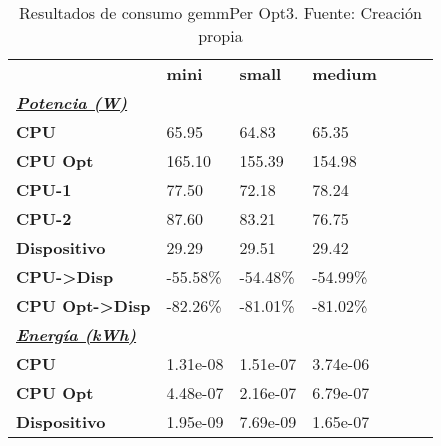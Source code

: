 \begin{table}[H]
    \centering
    \begin{tabular}{lllllll}
    \rowcolor[HTML]{DAE8FC} \ & \textbf{mini} & \textbf{	small} & \textbf{	medium} \\
    \cellcolor[HTML]{DAE8FC} \textbf{\textbf{{\emph{{\underline{{Potencia (W)}}}}}}} &  & 	 & 	 \\
    \rowcolor[HTML]{EFEFEF} \cellcolor[HTML]{DAE8FC} \textbf{CPU} & 65.95 & 	64.83 & 	65.35 \\
    \cellcolor[HTML]{DAE8FC} \textbf{CPU Opt} & 165.10 & 	155.39 & 	154.98 \\
    \rowcolor[HTML]{EFEFEF} \cellcolor[HTML]{DAE8FC} \textbf{\quad CPU-1} & 77.50 & 	72.18 & 	78.24 \\
    \cellcolor[HTML]{DAE8FC} \textbf{\quad CPU-2} & 87.60 & 	83.21 & 	76.75 \\
    \rowcolor[HTML]{EFEFEF} \cellcolor[HTML]{DAE8FC} \textbf{Dispositivo} & 29.29 & 	29.51 & 	29.42 \\
    \cellcolor[HTML]{DAE8FC} \textbf{CPU->Disp} & -55.58\% & 	-54.48\% & 	-54.99\% \\
    \rowcolor[HTML]{EFEFEF} \cellcolor[HTML]{DAE8FC} \textbf{CPU Opt->Disp} & -82.26\% & 	-81.01\% & 	-81.02\% \\
    \cellcolor[HTML]{DAE8FC} \textbf{\textbf{{\emph{{\underline{{Energía (kWh)}}}}}}} &  & 	 & 	 \\
    \rowcolor[HTML]{EFEFEF} \cellcolor[HTML]{DAE8FC} \textbf{CPU} & 1.31e-08 & 	1.51e-07 & 	3.74e-06 \\
    \cellcolor[HTML]{DAE8FC} \textbf{CPU Opt} & 4.48e-07 & 	2.16e-07 & 	6.79e-07 \\
    \rowcolor[HTML]{EFEFEF} \cellcolor[HTML]{DAE8FC} \textbf{Dispositivo} & 1.95e-09 & 	7.69e-09 & 	1.65e-07 \\
    \end{tabular}
    \caption[Resultados de consumo gemmPer Opt3]{{Resultados de consumo gemmPer Opt3. Fuente: Creación propia}}
    \label{table_test_gemmPer_Opt3_hw_powerResults}
\end{table}